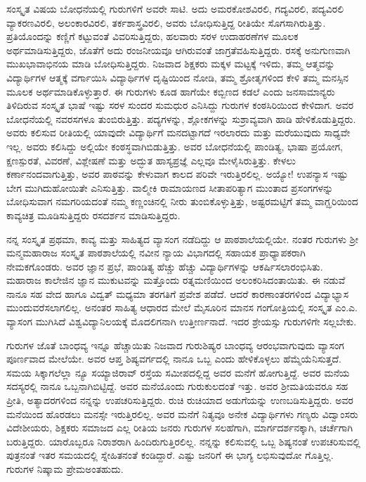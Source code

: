 {ಸಂಸ್ಕೃತ ವಿಷಯ ಬೋಧನೆಯಲ್ಲಿ ಗುರುಗಳಿಗೆ ಅವರೇ ಸಾಟಿ. ಅದು ಅಮರಕೋಶ\-ವಿರಲಿ, ಗದ್ಯವಿರಲಿ, ಪದ್ಯವಿರಲಿ ವ್ಯಾಕರಣವಿರಲಿ, ಅಲಂಕಾರವಿರಲಿ, ತರ್ಕಶಾಸ್ತ್ರ\-ವಿರಲಿ, ಅವರು ಬೋಧಿಸುತ್ತಿದ್ದ ರೀತಿಯೇ ಸೊಗಸಾಗಿರುತ್ತಿತ್ತು. ಪ್ರತಿಯೊಂದನ್ನು ಕಣ್ಣಿಗೆ ಕಟ್ಟುವಂತೆ ವಿವರಿಸುತ್ತಿದ್ದರು, ಹಲವಾರು ಸರಳ ಉದಾಹರಣೆಗಳ ಮೂಲಕ ಅರ್ಥಮಾಡಿ\-ಸುತ್ತಿದ್ದರು, ಜೊತೆಗೆ ಅದು ರಂಜನೀಯವೂ ಆಗಿರುವಂತೆ ಜಾಗ್ರತೆವಹಿಸು\-ತ್ತಿದ್ದರು. ರಸಕ್ಕೆ ಅನುಗುಣವಾಗಿ ಮುಖಭಾವಾಭಿನಯ ಮಾಡಿ ಬೋಧಿಸುತ್ತಿದ್ದರು. ನಿಜವಾದ ಶಿಕ್ಷಕರು ಮಕ್ಕಳ ಮಟ್ಟಕ್ಕೆ ಇಳಿದು, ತಮ್ಮ ಆತ್ಮವನ್ನು ವಿದ್ಯಾರ್ಥಿಗಳ ಆತ್ಮಕ್ಕೆ ವರ್ಗಾಯಿಸಿ ವಿದ್ಯಾರ್ಥಿಗಳ ದೃಷ್ಟಿಯಿಂದ ನೋಡಿ, ತಮ್ಮ ಶ್ರೋತೃಗಳಿಂದ ಕೇಳಿ ತಮ್ಮ ಮನಸ್ಸಿನ ಮೂಲಕ ಅರ್ಥಮಾಡಿಕೊಳ್ಳುತ್ತಾರೆ. ಈ ಗುರುಗಳು ಕೂಡ ಹಾಗೆಯೇ ಕಬ್ಬಿಣದ ಕಡಲೆ ಎಂದು ಜನಸಾಮಾನ್ಯರು ತಿಳಿದಿರುವ ಸಂಸ್ಕೃತ ಭಾಷೆ ಇಷ್ಟು ಸರಳ ಸುಂದರ ಸುಮಧುರ ಎನಿಸಿದ್ದು ಗುರುಗಳ ಕಂಠಸಿರಿಯಿಂದ ಕೇಳಿದಾಗ. ಅವರ ಬೋಧನೆಯಲ್ಲಿ ನವರಸಗಳೂ ತುಂಬಿರುತ್ತಿತ್ತು. ಪದ್ಯಗಳನ್ನು, ಶ್ಲೋಕಗಳನ್ನು ಸುಶ್ರಾವ್ಯವಾಗಿ ಹಾಡಿ ಹೇಳಿಕೊಡುತ್ತಿದ್ದರು. ಅವರು ಕಲಿಸುವ ರೀತಿಯಲ್ಲಿ ಯಾವುದೇ ವಿದ್ಯಾರ್ಥಿಗೆ ಮನದಟ್ಟಾಗದೆ ಇರಲಾರದು ಮತ್ತು ಮರೆಯುವುದು ಸಾಧ್ಯವೇ ಇಲ್ಲ. ಅವರು ಕಲಿಸಿದ್ದು ಅಲ್ಲಿಯೇ ಕಂಠಸ್ಥವಾಗಿಬಿಡುತ್ತಿತ್ತು. ಅವರ ಬೋಧನೆಯಲ್ಲಿ ಪಾಂಡಿತ್ಯ, ಭಾಷಾ ಪ್ರಯೋಗ, ಕ್ಷಣಸ್ಪುರತೆ, ವಿವರಣೆ, ವಿಶ್ಲೇಷಣೆ ಮತ್ತು ಅದ್ಭುತ ಹಾಸ್ಯಪ್ರಜ್ಞೆ ಎಲ್ಲವೂ ಮೇಳೈಸಿರುತ್ತಿತ್ತು. ಕೇಳಲು ಕರ್ಣಾನಂದವಾಗುತ್ತಿತ್ತು, ಅವರ ಪಾಠವನ್ನು ಕೇಳುವಾಗ ಕಾಲದ ಪರಿವೇ ಇರುತ್ತಿರಲಿಲ್ಲ. ಅಯ್ಯೋ! ಉಪನ್ಯಾಸ ಇಷ್ಟು ಬೇಗ ಮುಗಿದುಹೋಯಿತೇ ಎನಿಸುತ್ತಿತ್ತು. ವಾಲ್ಮೀಕಿ ರಾಮಾಯಣದ ಸೀತಾಪರಿತ್ಯಾಗ ಮುಂತಾದ ಪ್ರಸಂಗಗಳನ್ನು ಬೋಧಿಸುವಾಗ ನಮಗರಿಯದಂತೆ ನಮ್ಮ ಕಣ್ಣಂಚಿನಲ್ಲಿ ನೀರು ತುಂಬಿಕೊಳ್ಳುತ್ತಿತ್ತು, ಅಷ್ಟರಮಟ್ಟಿಗೆ ತಮ್ಮ ವಾಗ್ಝರಿಯಿಂದ ಕಾವ್ಯಚಿತ್ರ ಮೂಡಿಸುತ್ತಿದ್ದರು ರಸದರ್ಶನ ಮಾಡಿಸುತ್ತಿದ್ದರು.

ನನ್ನ ಸಂಸ್ಕೃತ ಪ್ರಥಮಾ, ಕಾವ್ಯ ಮತ್ತು ಸಾಹಿತ್ಯದ ವ್ಯಾಸಂಗ ನಡೆದಿದ್ದು ಆ ಪಾಠಶಾಲೆಯಲ್ಲಿಯೇ. ನಂತರ ಗುರುಗಳು ಶ್ರೀ ಮನ್ಮಮಹಾರಾಜ ಸಂಸ್ಕೃತ ಪಾಠಶಾಲೆಯಲ್ಲಿ ನವೀನ ನ್ಯಾಯ ವಿಭಾಗದಲ್ಲಿ ಸಹಾಯಕ ಪ್ರಾಧ್ಯಾಪಕರಾಗಿ ನೇಮಕಗೊಂಡರು. ಅವರ ಜ್ಞಾನ ಪ್ರಭೆ, ಪಾಂಡಿತ್ಯ ಹೆಚ್ಚು ಹೆಚ್ಚು ವಿದ್ಯಾರ್ಥಿಗಳನ್ನು ಆಕರ್ಷಿಸಲಾರಂಭಿಸಿತು. ಮಹಾರಾಜ ಕಾಲೇಜಿನ ಜ್ಞಾನ ಮುಕುಟವನ್ನು ಮತ್ತೊಂದು ರತ್ನಮಣಿಯಿಂದ ಅಲಂಕರಿಸಿದಂತಾಯಿತು. ಈ ನಡುವೆ ನಾನೂ ಸಹ ವೇದ ಹಾಗೂ ವಿದ್ವತ್ ಮಧ್ಯಮಾ ತರಗತಿಗೆ ಪ್ರವೇಶ ಪಡೆದೆ. ಆದರೆ ಕಾರಣಾಂತರಗಳಿಂದ ವಿದ್ಯಾಭ್ಯಾಸ ಮುಂದುವರೆಸಲಾಗಲಿಲ್ಲ. ಅನಂತರ ಸಾಹಿತ್ಯ ಆಧಾರದ ಮೇಲೆ ಮೈಸೂರಿನ ಮಾನಸ ಗಂಗೋತ್ರಿಯಲ್ಲಿ ಸಂಸ್ಕೃತ ಎಂ.ಎ. ವ್ಯಾಸಂಗ ಮುಗಿಸಿದೆ ವಿಶ್ವವಿದ್ಯಾನಿಲಯಕ್ಕೆ ಮೊದಲಿಗನಾಗಿ ಉತ್ತೀರ್ಣನಾದೆ. ಇದರ ಶ್ರೇಯಸ್ಸು ಗುರುಗಳಿಗೇ ಸಲ್ಲಬೇಕು.

ಗುರುಗಳ ಜೊತೆ ಬಾಂಧವ್ಯ ಇನ್ನೂ ಹೆಚ್ಚಾಯಿತು ನಿಜವಾದ ಗುರು\enginline{-}ಶಿಷ್ಯರ ಬಾಂಧವ್ಯ ಆರಂಭವಾಗುವುದು ವ್ಯಾಸಂಗ ಪೂರ್ಣವಾದ ಮೇಲೆಯೇ. ಅವರ ಆಪ್ತ ಶಿಷ್ಯವರ್ಗದಲ್ಲಿ ನಾನೂ ಒಬ್ಬ ಎಂದು ಹೇಳಿಕೊಳ್ಳಲು ಹೆಮ್ಮೆಯೆನಿಸುತ್ತದೆ. ಸಮಯ ಸಿಕ್ಕಾಗಲೆಲ್ಲಾ ನ್ಯೂ ಸಯ್ಯಾಜಿರಾವ್ ರಸ್ತೆಯ ಸಮೀಪದಲ್ಲಿದ್ದ ಅವರ ಮನೆಗೆ ಹೋಗುತ್ತಿದ್ದೆ. ಅವರ ಮನೆಯ ಸದಸ್ಯರಲ್ಲಿ ನಾನೂ ಒಬ್ಬನಾಗಿಬಿಟ್ಟಿದ್ದೆ. ಅವರ ಮನೆಯೊಂದು ಗುರುಕುಲದಂತೆ ಇತ್ತು. ಅವರ ಶ್ರೀಮತಿಯವರೂ ಸಹ ಪ್ರೀತಿ, ಅತ್ಯಾದರಗಳಿಂದ ನನ್ನನ್ನು ಉಪಚರಿಸುತ್ತಿದ್ದರು. ರುಚಿ ರುಚಿಯಾದ ಅಡುಗೆಯನ್ನು ಉಣಬಡಿಸುತ್ತಿದ್ದರು. ಅವರ ಮನೆಯಿಂದ ಹೊರಡಲು ಮನಸ್ಸೇ ಇರುತ್ತಿರಲಿಲ್ಲ. ಅವರ ಮನೆಗೆ ನಿತ್ಯವೂ ಅನೇಕ ವಿದ್ಯಾರ್ಥಿಗಳು ಗಣ್ಯರು ವಿದ್ವಾಂಸರು ವಿದೇಶೀಯರು, ಶಿಕ್ಷಕರು ಸಮಾಜದ ಎಲ್ಲ ರೀತಿಯ ಜನರು ಗುರುಗಳ ಸಲಹೆಗಾಗಿ, ಮಾರ್ಗದರ್ಶನಕ್ಕಾಗಿ, ಚರ್ಚೆಗಾಗಿ ಬರುತ್ತಿದ್ದರು. ಯಾರೊಬ್ಬರೂ ನಿರಾಶರಾಗಿ ಹಿಂದಿರುಗುತ್ತಿರಲಿಲ್ಲ. ನನ್ನನ್ನು ಕಲಿಸುವಲ್ಲಿ ಒಬ್ಬ ಶಿಷ್ಯನಂತೆ ಉಪಚರಿಸುವಲ್ಲಿ ಪುತ್ರನಂತೆ ಇತರ ಸಮಯದಲ್ಲಿ ಸ್ನೇಹಿತನಂತೆ ಕಂಡಿದ್ದಾರೆ. ಎಷ್ಟು ಜನರಿಗೆ ಈ ಭಾಗ್ಯ ಲಭಿಸುವುದೋ ಗೊತ್ತಿಲ್ಲ. ಗುರುಗಳ ನಿಷ್ಕಾಮ ಪ್ರೇಮ\break ಅಂತಹುದು.

}
